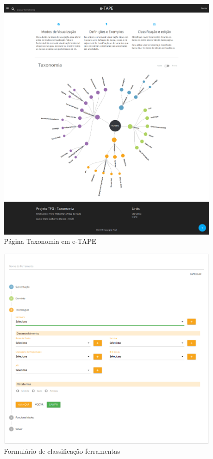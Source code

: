 \begin{figure}[!ht]
    \centering
    \includegraphics[scale=0.10]{./figuras/pagina-taxonomia.png}
    \caption{Página Taxonomia em e-TAPE }
    \label{fig:pag-taxonomia}
\end{figure}


\begin{figure}[!ht]
    \centering
    \includegraphics[scale=0.20]{./figuras/new-ferramenta.png}
    \caption{Formulário de classificação ferramentas}
    \label{fig:new-ferramenta}
\end{figure}



